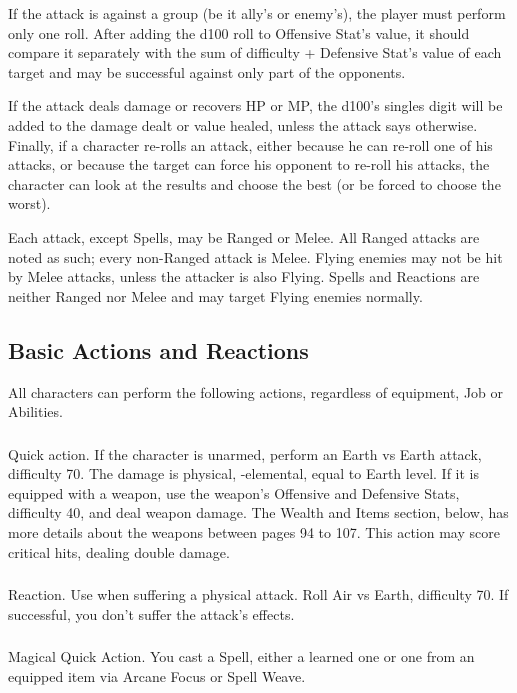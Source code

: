 \begin{multicols}{2}
If the attack is against a group (be it ally’s or enemy’s), the player must perform only one roll. After adding the d100 roll to Offensive Stat’s value, it should compare it separately with the sum of difficulty + Defensive Stat’s value of each target and may be successful against only part of the opponents.

If the attack deals damage or recovers HP or MP, the d100’s singles digit will be added to the damage dealt or value healed, unless the attack says otherwise. Finally, if a character re-rolls an attack, either because he can re-roll one of his attacks, or because the target can force his opponent to re-roll his attacks, the character can look at the results and choose the best (or be forced to choose the worst).

Each attack, except Spells, may be Ranged or Melee. All Ranged attacks are noted as such; every non-Ranged attack is Melee. Flying enemies may not be hit by Melee attacks, unless the attacker is also Flying. Spells and Reactions are neither Ranged nor Melee and may target Flying enemies normally.

\subsection{Basic Actions and Reactions}\label{subsec:basicactions}
All characters can perform the following actions, regardless of equipment, Job or Abilities.

\subsubsection{}
Quick action. If the character is unarmed, perform an Earth vs Earth attack, difficulty 70. The damage is physical, -elemental, equal to Earth level. If it is equipped with a weapon, use the weapon’s Offensive and Defensive Stats, difficulty 40, and deal weapon damage. The Wealth and Items section, below, has more details about the weapons between pages 94 to 107. This action may score critical hits, dealing double damage.

\subsubsection{}
Reaction. Use when suffering a physical attack. Roll Air vs Earth, difficulty 70. If successful, you don’t suffer the attack’s effects.

\subsubsection{}
Magical Quick Action. You cast a Spell, either a learned one or one from an equipped item via Arcane Focus or Spell Weave.


\end{multicols}
